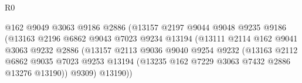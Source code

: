 \begin{lexlean}{R0}
\begin{coremodule}
                                          @162
                                          @9049
                                          @3063
                                          @9186
                                          @2886
                                          (@13157
                                            @2197
                                            @9044
                                            @9048
                                            @9235
                                            @9186
                                            (@13163
                                              @2196
                                              @6862
                                              @9043
                                              @7023
                                              @9234
                                              @13194
                                              (@13111
                                                @2114
                                                @162
                                                @9041
                                                @3063
                                                @9232
                                                @2886
                                                (@13157
                                                  @2113
                                                  @9036
                                                  @9040
                                                  @9254
                                                  @9232
                                                  (@13163
                                                    @2112
                                                    @6862
                                                    @9035
                                                    @7023
                                                    @9253
                                                    @13194
                                                    (@13235
                                                      @162
                                                      @7229
                                                      @3063
                                                      @7432
                                                      @2886
                                                      @13276
                                                      @13190))
                                                  @9309)
                                                @13190))

\end{coremodule}
\end{lexlean}
